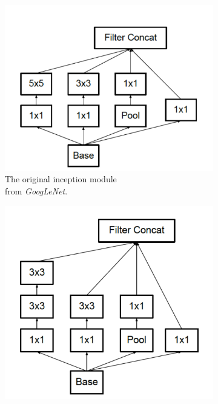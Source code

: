 \begin{figure}[!hb]
    \centering
    \begin{subfigure}[t]{0.49\textwidth}
        \includegraphics[width=\textwidth]{Figures/InceptionOrg}
        \caption{The original inception module \\from \textit{GoogLeNet}.}
    \end{subfigure}%
    \centering
    \begin{subfigure}[t]{0.49\textwidth}
        \includegraphics[width=\textwidth]{Figures/InceptionV2}

\end{subfigure}
\end{figure}
